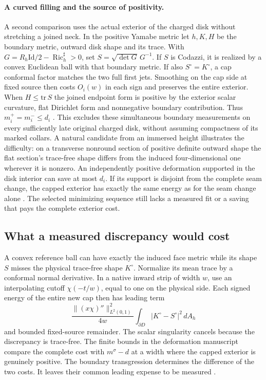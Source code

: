 \documentclass[11pt,letterpaper]{article}
\numberwithin{equation}{section}
\DeclareMathOperator{\Ric}{Ric}
\begin{document}
\paragraph{A curved filling and the source of positivity.}
A second comparison uses the actual exterior of the charged disk
without stretching a joined neck. In the positive Yamabe metric let
\(h,K,H\) be the boundary metric, outward disk shape and its trace.
With \(G=R_h\mathrm{Id}/2-\Ric_h^\sharp>0\), set
\(S=\sqrt{\det G}\,G^{-1}\). If \(S\) is Codazzi, it is realized
by a convex Euclidean ball with that boundary metric. If also
\(S^\circ=K^\circ\), a cap conformal factor matches the two full
first jets. Smoothing on the cap side at fixed source then costs
\(O_i(w)\) in each sign and preserves the entire exterior.
When \(H\le\mathrm{tr}\,S\) the joined endpoint form is positive
by the exterior scalar curvature, flat Dirichlet form and nonnegative
boundary contribution. Thus \(m_i^+=m_i^-\le d_i\)
\cite{Baker2026CollarDeformation}. This excludes these simultaneous
boundary measurements on every sufficiently late original charged
disk, without assuming compactness of its marked collars. A natural
candidate from an immersed height illustrates the difficulty:
on a transverse nonround section of positive definite outward shape
the flat section's trace-free shape differs from the induced
four-dimensional one wherever it is nonzero.
An independently positive deformation supported in the disk interior
can save at most \(d_i\). If its support is disjoint from the complete
seam change, the capped exterior has exactly the same energy as for
the seam change alone \cite{Baker2026CollarDeformation}.
The selected minimizing sequence still lacks a measured fit or a
saving that pays the complete exterior cost.

\subsection{What a measured discrepancy would cost}
A convex reference ball can have exactly the induced face metric while
its shape \(S\) misses the physical trace-free shape \(K^\circ\).
Normalize its mean trace by a conformal normal derivative. In a
native inward strip of width \(w\), use an interpolating cutoff
\(\chi(-t/w)\), equal to one on the physical side. Each signed
energy of the entire new cap then has leading term
\[
 \frac{\|(x\chi)''\|_{L^2(0,1)}^2}{4w}
      \int_{\partial D}|K^\circ-S^\circ|^2\,dA_h
\]
and bounded fixed-source remainder. The scalar singularity cancels
because the discrepancy is trace-free. The finite bounds in the
deformation manuscript compare the complete cost with \(m^\sigma-d\)
at a width where the capped exterior is genuinely positive.
The boundary transgression determines the difference of the two costs.
It leaves their common leading expense to be measured
\cite{Baker2026CollarDeformation}.
\end{document}
